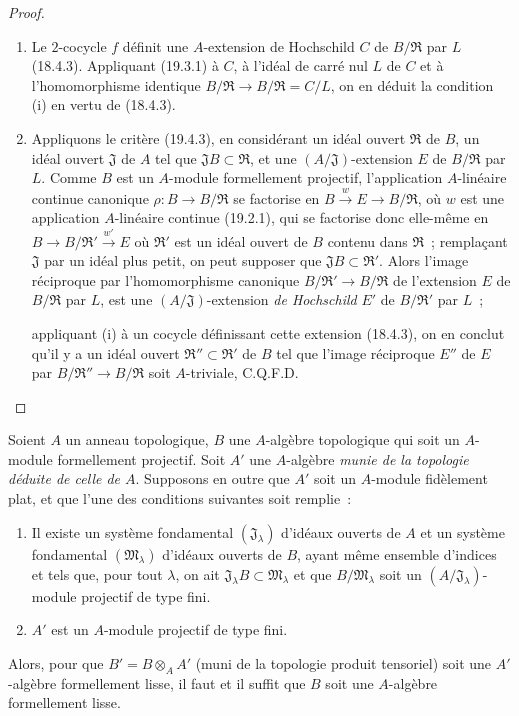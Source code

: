 \begin{proof}
\begin{enumerate}
  \item[(i)] Le $2$-cocycle $f$ définit une $A$-extension de Hochschild $C$
  de $B/\mathfrak R$ par $L$ (18.4.3). Appliquant (19.3.1) à $C$, à l'idéal
  de carré nul $L$ de $C$ et à l'homomorphisme identique
  $B/\mathfrak R\to B/\mathfrak R=C/L$, on en déduit la condition (i) en
  vertu de (18.4.3).
  \item[(ii)] Appliquons le critère (19.4.3), en considérant un idéal ouvert
  $\mathfrak R$ de $B$, un idéal ouvert $\mathfrak J$ de $A$ tel que
  $\mathfrak JB\subset\mathfrak R$, et une $(A/\mathfrak J)$-extension $E$
  de $B/\mathfrak R$ par $L$. Comme $B$ est un $A$-module formellement
  projectif, l'application $A$-linéaire continue canonique
  $\rho:B\to B/\mathfrak R$ se factorise en
  $B\xrightarrow{w}E\to B/\mathfrak R$, où $w$ est une application
  $A$-linéaire continue (19.2.1), qui se factorise donc elle-même en
  $B\to B/\mathfrak R'\xrightarrow{w'}E$ où $\mathfrak R'$ est un idéal
  ouvert de $B$ contenu dans $\mathfrak R$~; remplaçant $\mathfrak J$ par
  un idéal plus petit, on peut supposer que
  $\mathfrak JB\subset\mathfrak R'$. Alors l'image réciproque par
  l'homomorphisme canonique $B/\mathfrak R'\to B/\mathfrak R$ de
  l'extension $E$ de $B/\mathfrak R$ par $L$, est une
  $(A/\mathfrak J)$-extension \emph{de Hochschild} $E'$ de
  $B/\mathfrak R'$ par $L$~;


  appliquant (i) à un cocycle définissant cette extension (18.4.3), on en
  conclut qu'il y a un idéal ouvert
  $\mathfrak R''\subset\mathfrak R'$ de $B$ tel que l'image réciproque
  $E''$ de $E$ par $B/\mathfrak R''\to B/\mathfrak R$ soit
  $A$-triviale, C.Q.F.D.
\end{enumerate}
\end{proof}

\begin{corollary}[19.4.6]
\label{0.19.4.6-fr}
Soient $A$ un anneau topologique, $B$ une $A$-algèbre topologique qui soit un
$A$-module formellement projectif. Soit $A'$ une $A$-algèbre \emph{munie de
la topologie déduite de celle de $A$}. Supposons en outre que $A'$ soit un
$A$-module fidèlement plat, et que l'une des conditions suivantes soit
remplie~:
\begin{enumerate}
  \item[$1^\circ$] Il existe un système fondamental
  $(\mathfrak J_\lambda)$ d'idéaux ouverts de $A$ et un système fondamental
  $(\mathfrak M_\lambda)$ d'idéaux ouverts de $B$, ayant même ensemble
  d'indices et tels que, pour tout $\lambda$, on ait
  $\mathfrak J_\lambda B\subset\mathfrak M_\lambda$ et que
  $B/\mathfrak M_\lambda$ soit un
  $(A/\mathfrak J_\lambda)$-module projectif de type fini.
  \item[$2^\circ$] $A'$ est un $A$-module projectif de type fini.
\end{enumerate}
Alors, pour que $B'=B\otimes_A A'$ (muni de la topologie produit tensoriel)
soit une $A'$-algèbre formellement lisse, il faut et il suffit que $B$ soit une
$A$-algèbre formellement lisse.
\end{corollary}

